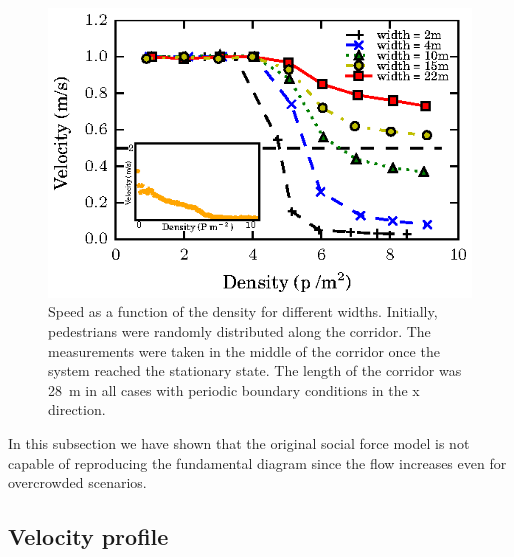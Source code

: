 \begin{figure}[htbp!]
\includegraphics[width=\columnwidth]
{plots/speed-density_vd1_multiple_widths.eps}
\caption{\label{fundamental_diagram_speed} Speed as a function of the density for different widths. Initially, 
pedestrians were randomly distributed along the corridor. The measurements were taken in the middle
of the corridor once the system reached the stationary state. The length of the corridor 
was 28~m in all cases with periodic boundary conditions in the x direction.}
\end{figure}

In this subsection we have shown that the original social force model is not capable of reproducing the fundamental diagram since the flow increases even for overcrowded scenarios. 


\subsection{\label{velocity_profile} Velocity profile}

